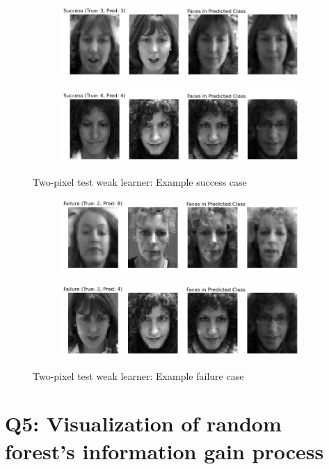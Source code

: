 \begin{figure}[htbp]
	\centering
	\begin{subfigure}{0.45\linewidth}
		\centering
		\includegraphics[width=\linewidth]{image/q5-app/q5-two-succ1.png}
	\end{subfigure}%
	\quad
	\begin{subfigure}{0.45\linewidth}
		\centering
		\includegraphics[width=\linewidth]{image/q5-app/q5-two-succ2.png}
	\end{subfigure}
	\caption{Two-pixel test weak learner: Example success case}
\end{figure}
\begin{figure}[htbp]
	\centering
	\begin{subfigure}{0.45\linewidth}
		\centering
		\includegraphics[width=\linewidth]{image/q5-app/q5-two-fail1.png}
	\end{subfigure}%
	\quad
	\begin{subfigure}{0.45\linewidth}
		\centering
		\includegraphics[width=\linewidth]{image/q5-app/q5-two-fail2.png}
	\end{subfigure}
	\caption{Two-pixel test weak learner: Example failure case}
\end{figure}

\section{Q5: Visualization of random forest's information gain process}
\label{subsec:Q5-2}